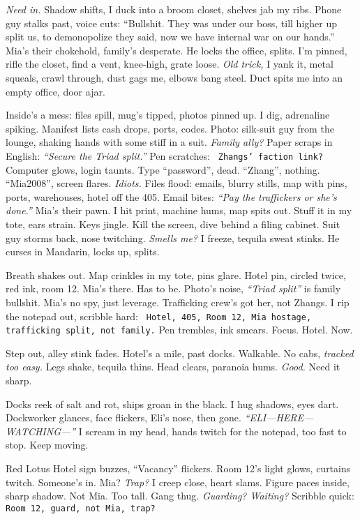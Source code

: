 \documentclass[12pt]{article} %
\newcommand{\note}[1]{\texttt{\small \color{DarkGray} #1}}
\begin{document}
\textit{Need in.} Shadow shifts, I duck into a broom closet, shelves jab my ribs. Phone guy stalks past, voice cuts: “Bullshit. They was under our boss, till higher up split us, to demonopolize they said, now we have internal war on our hands.” \textnormal{Mia}’s their chokehold, family’s desperate. He locks the office, splits. I’m pinned, rifle the closet, find a vent, knee-high, grate loose. \textit{Old trick,} I yank it, metal squeals, crawl through, dust gags me, elbows bang steel. Duct spits me into an empty office, door ajar.

Inside’s a mess: files spill, mug’s tipped, photos pinned up. I dig, adrenaline spiking. Manifest lists cash drops, ports, codes. Photo: silk-suit guy from the lounge, shaking hands with some stiff in a suit. \textit{Family ally?} Paper scraps in English: \textit{“Secure the Triad split.”} Pen scratches: \note{Zhangs’ faction link?} Computer glows, login taunts. Type “password”, dead. “Zhang”, nothing. “Mia2008”, screen flares. \textit{Idiots.} Files flood: emails, blurry stills, map with pins, ports, warehouses, hotel off the 405. Email bites: \textit{“Pay the traffickers or she’s done.”} \textnormal{Mia}’s their pawn. I hit print, machine hums, map spits out. Stuff it in my tote, ears strain. Keys jingle. Kill the screen, dive behind a filing cabinet. Suit guy storms back, nose twitching. \textit{Smells me?} I freeze, tequila sweat stinks. He curses in Mandarin, locks up, splits.

Breath shakes out. Map crinkles in my tote, pins glare. Hotel pin, circled twice, red ink, room 12. \textnormal{Mia}’s there. Has to be. Photo’s noise, \textit{“Triad split”} is family bullshit. \textnormal{Mia}’s no spy, just leverage. Trafficking crew’s got her, not Zhangs. I rip the notepad out, scribble hard: \note{Hotel, 405, Room 12, Mia hostage, trafficking split, not family.} Pen trembles, ink smears. Focus. Hotel. Now.

Step out, alley stink fades. Hotel’s a mile, past docks. Walkable. No cabs, \textit{tracked too easy.} Legs shake, tequila thins. Head clears, paranoia hums. \textit{Good.} Need it sharp.

Docks reek of salt and rot, ships groan in the black. I hug shadows, eyes dart. Dockworker glances, face flickers, \textnormal{Eli}’s nose, then gone. \textit{“ELI—HERE—WATCHING—”} I scream in my head, hands twitch for the notepad, too fast to stop. Keep moving.

Red Lotus Hotel sign buzzes, “Vacancy” flickers. Room 12’s light glows, curtains twitch. Someone’s in. \textnormal{Mia}? \textit{Trap?} I creep close, heart slams. Figure paces inside, sharp shadow. Not \textnormal{Mia}. Too tall. Gang thug. \textit{Guarding? Waiting?} Scribble quick: \note{Room 12, guard, not Mia, trap?}
\end{document}
